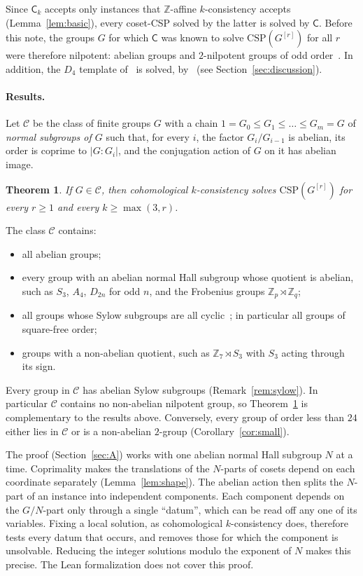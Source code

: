 \documentclass[11pt]{article}
\newtheorem{mainthm}{Theorem}
\theoremstyle{definition}
\theoremstyle{remark}
\newcommand{\Csp}{\mathrm{CSP}}
\newcommand{\Coh}{\mathsf{C}}
\newcommand{\Z}{\mathbb Z}
\begin{document}
Since $\Coh_k$ accepts only instances that $\Z$-affine $k$-consistency accepts
(Lemma~\ref{lem:basic}), every coset-CSP solved by the latter is solved by
$\Coh$. Before this note, the groups $G$ for which $\Coh$ was known to solve
$\Csp(G^{[r]})$ for all $r$ were therefore nilpotent: abelian groups and
$2$-nilpotent groups of odd order~\cite{LP25}. In addition, the $D_4$ template
of~\cite{Zhu25} is solved, by~\cite{BHZ26} (see Section~\ref{sec:discussion}).

\paragraph{Results.} Let $\mathcal C$ be the class of finite groups $G$ with a
chain $1=G_0\le G_1\le\dots\le G_m=G$ of \emph{normal subgroups of $G$} such
that, for every $i$, the factor $G_i/G_{i-1}$ is abelian, its order is coprime to
$|G:G_i|$, and the conjugation action of $G$ on it has abelian image.

\begin{mainthm}\label{thm:A}
If $G\in\mathcal C$, then cohomological $k$-consistency solves
$\Csp(G^{[r]})$ for every $r\ge1$ and every $k\ge\max(3,r)$.
\end{mainthm}

The class $\mathcal C$ contains:
\begin{itemize}
\item all abelian groups;
\item every group with an abelian normal Hall subgroup whose quotient is abelian,
such as $S_3$, $A_4$, $D_{2n}$ for odd $n$, and the Frobenius groups
$\Z_p\rtimes\Z_q$;
\item all groups whose Sylow subgroups are all cyclic~\cite{Rob96}; in
particular all groups of square-free order;
\item groups with a non-abelian quotient, such as $\Z_7\rtimes S_3$ with $S_3$
acting through its sign.
\end{itemize}
Every group in $\mathcal C$ has abelian Sylow subgroups (Remark~\ref{rem:sylow}).
In particular $\mathcal C$ contains no non-abelian nilpotent group, so
Theorem~\ref{thm:A} is complementary to the results above. Conversely, every group
of order less than $24$ either lies in $\mathcal C$ or is a non-abelian
$2$-group (Corollary~\ref{cor:small}).

The proof (Section~\ref{sec:A}) works with one abelian normal Hall subgroup $N$ at
a time. Coprimality makes the translations of the $N$-parts of cosets depend on
each coordinate separately (Lemma~\ref{lem:shape}). The abelian action then
splits the $N$-part of an instance into independent components. Each component
depends on the $G/N$-part only through a single ``datum'', which can be read off
any one of its variables. Fixing a local solution, as cohomological
$k$-consistency does, therefore tests every datum that occurs, and removes those
for which the component is unsolvable. Reducing the integer solutions modulo the
exponent of $N$ makes this precise. The Lean formalization does not cover this
proof.
\end{document}
